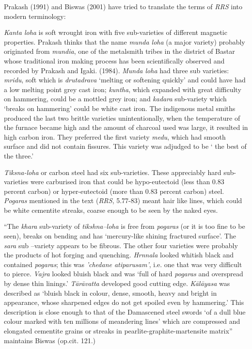 Prakash (1991) and Biswas (2001) have tried to translate the terms of {\it RRS} into modern terminology:

{\it Kanta loha} is soft wrought iron with five sub-varieties of different magnetic properties. Prakash thinks that the name {\it munda loha} (a major variety) probably originated from {\it mundia}, one of the metalsmith tribes in the district of Bastar whose traditional iron making process has been scientifically observed and recorded by Prakash and Igaki. (1984). {\it Munda loha} had three sub varieties: {\it mridu}, soft which is {\it drutadrava} ‘melting or softening quickly’ and could have had a low melting point grey cast iron; {\it kuntha}, which expanded with great difficulty on hammering, could be a mottled grey iron; and {\it kadara} sub-variety which ‘breaks on hammering’ could be white cast iron. The indigenous metal smiths produced the last two brittle varieties unintentionally, when the temperature of the furnace became high and the amount of charcoal used was large, it resulted in high carbon iron. They preferred the first variety {\it medu}, which had smooth surface and did not contain fissures. This variety was adjudged to be ‘ the best of the three.’

{\it Tiksna-loha} or carbon steel had six sub-varieties. These appreciably hard sub-varieties were carburised iron that could be hypo-eutectoid (less than 0.83 percent carbon) or hyper-eutectoid (more than 0.83 percent carbon) steel. {\it Pogaras} mentioned in the text ({\it RRS}, 5.77-83) meant hair like lines, which could be white cementite streaks, coarse enough to be seen by the naked eyes.

“The {\it khara} sub-variety of {\it tikshna–loha} is free from {\it pogaras} (or it is too fine to be seen), breaks on bending and has ‘mercury-like shining fractured surface’. The {\it sara} sub –variety appears to be fibrous. The other four varieties were probably the products of hot forging and quenching. {\it Hrnnala} looked whitish black and contained {\it pogaras}; this was {\it 'chedane atiparusam'}, i.e. one that was very difficult to pierce. {\it Vajra} looked bluish black and was ‘full of hard {\it pogaras} and overspread by dense thin linings.’ {\it Tārāvatta} developed good cutting edge. {\it Kālāyasa} was described as ‘bluish black in colour, dense, smooth, heavy and bright in appearance, whose sharpened edges do not get spoiled even by hammering.’ This description is close enough to that of the Damascened steel swords ‘of a dull blue colour marked with ten millions of meandering lines’ which are compressed and elongated cementite grains or streaks in pearlite-graphite-martensite matrix” maintains Biswas (op.cit. 121.)

